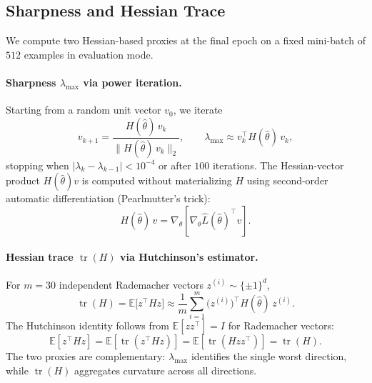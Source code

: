 \documentclass[11pt]{article}
\begin{document}
\FloatBarrier

\subsection{Sharpness and Hessian Trace}
\label{sec:hessian}

We compute two Hessian-based proxies at the final epoch on a fixed mini-batch of $512$ examples in evaluation mode.

\paragraph{Sharpness $\lambda_{\max}$ via power iteration.}
Starting from a random unit vector $v_0$, we iterate
\[
  v_{k+1} = \frac{H(\hat\theta)\,v_k}{\|H(\hat\theta)\,v_k\|_2},
  \qquad
  \lambda_{\max} \approx v_k^\top H(\hat\theta)\,v_k,
\]
stopping when $|\lambda_k - \lambda_{k-1}| < 10^{-4}$ or after $100$ iterations.
The Hessian-vector product $H(\hat\theta)v$ is computed without materializing $H$ using second-order automatic differentiation (Pearlmutter's trick):
\[
  H(\hat\theta)\,v = \nabla_\theta\!\left[\nabla_\theta \widehat{L}(\hat\theta)^\top v\right].
\]

\paragraph{Hessian trace $\operatorname{tr}(H)$ via Hutchinson's estimator.}
For $m = 30$ independent Rademacher vectors $z^{(i)} \sim \{\pm 1\}^d$,
\[
  \operatorname{tr}(H) = \mathbb{E}\bigl[z^\top H z\bigr]
  \approx \frac{1}{m}\sum_{i=1}^{m} \bigl(z^{(i)}\bigr)^\top H(\hat\theta)\,z^{(i)}.
\]
The Hutchinson identity follows from $\mathbb{E}[zz^\top]=I$ for Rademacher vectors:
\[
\mathbb{E}[z^\top H z]
=
\mathbb{E}[\operatorname{tr}(z^\top H z)]
=
\mathbb{E}[\operatorname{tr}(Hzz^\top)]
=
\operatorname{tr}(H).
\]
The two proxies are complementary: $\lambda_{\max}$ identifies the single worst direction, while $\operatorname{tr}(H)$ aggregates curvature across all directions.
\end{document}
